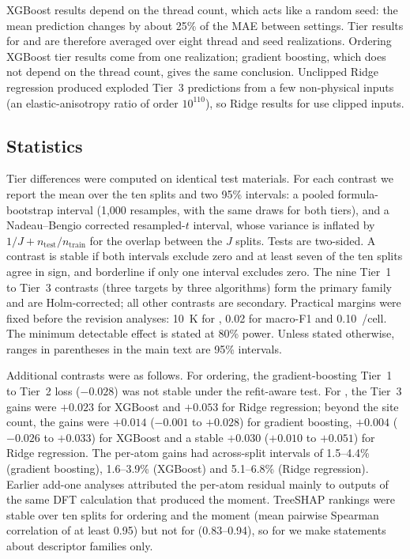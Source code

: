 \documentclass[11pt,a4paper]{article}
\begin{document}
XGBoost results depend on the thread count, which acts like a random seed: the mean prediction changes by about 25\% of the MAE between settings. Tier results for \Tc{} and \mcell{} are therefore averaged over eight thread and seed realizations. Ordering XGBoost tier results come from one realization; gradient boosting, which does not depend on the thread count, gives the same conclusion. Unclipped Ridge regression produced exploded Tier~3 predictions from a few non-physical inputs (an elastic-anisotropy ratio of order $10^{110}$), so Ridge results for \Tc{} use clipped inputs.

\subsection*{Statistics}
Tier differences were computed on identical test materials. For each contrast we report the mean over the ten splits and two 95\% intervals: a pooled formula-bootstrap interval (1,000 resamples, with the same draws for both tiers), and a Nadeau--Bengio corrected resampled-$t$ interval, whose variance is inflated by $1/J+n_\mathrm{test}/n_\mathrm{train}$ for the overlap between the $J$ splits\cite{nadeau2003inference}. Tests are two-sided. A contrast is stable if both intervals exclude zero and at least seven of the ten splits agree in sign, and borderline if only one interval excludes zero. The nine Tier~1 to Tier~3 contrasts (three targets by three algorithms) form the primary family and are Holm-corrected\cite{holm1979simple}; all other contrasts are secondary. Practical margins were fixed before the revision analyses: 10~K for \Tc{}, 0.02 for macro-F1 and 0.10~\muB{}/cell. The minimum detectable effect is stated at 80\% power. Unless stated otherwise, ranges in parentheses in the main text are 95\% intervals.

Additional contrasts were as follows. For ordering, the gradient-boosting Tier~1 to Tier~2 loss ($-0.028$) was not stable under the refit-aware test. For \mfu{}, the Tier~3 gains were $+0.023$ for XGBoost and $+0.053$ for Ridge regression; beyond the site count, the gains were $+0.014$ ($-0.001$ to $+0.028$) for gradient boosting, $+0.004$ ($-0.026$ to $+0.033$) for XGBoost and a stable $+0.030$ ($+0.010$ to $+0.051$) for Ridge regression. The per-atom gains had across-split intervals of 1.5--4.4\% (gradient boosting), 1.6--3.9\% (XGBoost) and 5.1--6.8\% (Ridge regression). Earlier add-one analyses attributed the per-atom residual mainly to outputs of the same DFT calculation that produced the moment. TreeSHAP rankings were stable over ten splits for ordering and the moment (mean pairwise Spearman correlation of at least 0.95) but not for \Tc{} (0.83--0.94), so for \Tc{} we make statements about descriptor families only.
\end{document}
